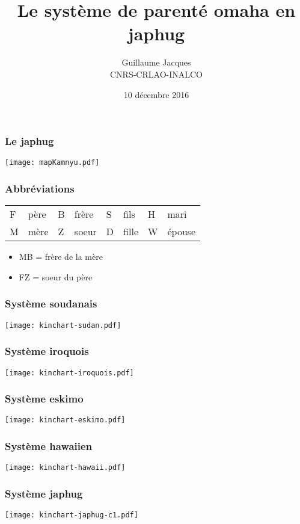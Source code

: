 \documentclass[xcolor=table]{beamer}
\begin{document}
 
  \begin{frame} 

 
\title{Le système de parenté omaha en japhug}
\author{Guillaume Jacques\\ CNRS-CRLAO-INALCO}
\date{10 décembre 2016}
\maketitle
\end{frame}   

  \begin{frame} 
 \frametitle{Le japhug} 
 \texttt{[image: mapKamnyu.pdf]}
  \end{frame} 
  
  \begin{frame} 
 \frametitle{Abbréviations} 
 
\begin{tabular}{ll|ll|ll|ll}
\toprule
F & père & B & frère & S & fils & H & mari \\
M & mère & Z & soeur & D & fille & W & épouse \\
\bottomrule
\end{tabular}

\begin{itemize}
\item MB = frère de la mère
\item FZ = soeur du père
\end{itemize}
\end{frame}

  \begin{frame} 
 \frametitle{Système soudanais} 
\texttt{[image: kinchart-sudan.pdf]}
\end{frame}

  \begin{frame} 
 \frametitle{Système iroquois} 
\texttt{[image: kinchart-iroquois.pdf]}
\end{frame}

  \begin{frame} 
 \frametitle{Système eskimo} 
\texttt{[image: kinchart-eskimo.pdf]}
\end{frame}

  \begin{frame} 
 \frametitle{Système hawaiien} 
\texttt{[image: kinchart-hawaii.pdf]}
\end{frame}

  \begin{frame} 
 \frametitle{Système japhug} 
\texttt{[image: kinchart-japhug-c1.pdf]}
\end{frame}
\end{document}
